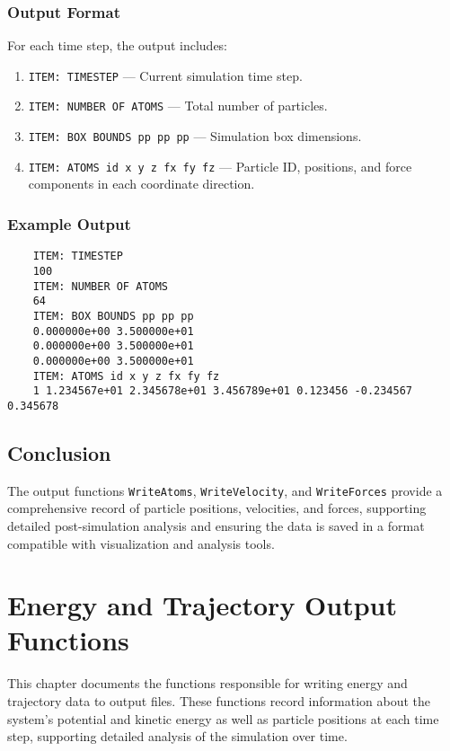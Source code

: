 \documentclass[12pt, ngerman]{report}
\begin{document}
\subsection*{Output Format}
For each time step, the output includes:
\begin{enumerate}
	\item \texttt{ITEM: TIMESTEP} --- Current simulation time step.
	\item \texttt{ITEM: NUMBER OF ATOMS} --- Total number of particles.
	\item \texttt{ITEM: BOX BOUNDS pp pp pp} --- Simulation box dimensions.
	\item \texttt{ITEM: ATOMS id x y z fx fy fz} --- Particle ID, positions, and force components in each coordinate direction.
\end{enumerate}

\subsection*{Example Output}
\begin{verbatim}
	ITEM: TIMESTEP 
	100 
	ITEM: NUMBER OF ATOMS 
	64 
	ITEM: BOX BOUNDS pp pp pp 
	0.000000e+00 3.500000e+01 
	0.000000e+00 3.500000e+01 
	0.000000e+00 3.500000e+01 
	ITEM: ATOMS id x y z fx fy fz 
	1 1.234567e+01 2.345678e+01 3.456789e+01 0.123456 -0.234567 0.345678 
\end{verbatim}

\section{Conclusion}
The output functions \texttt{WriteAtoms}, \texttt{WriteVelocity}, and \texttt{WriteForces} provide a comprehensive record of particle positions, velocities, and forces, supporting detailed post-simulation analysis and ensuring the data is saved in a format compatible with visualization and analysis tools.


\chapter{Energy and Trajectory Output Functions}
\label{chap:energy_trajectory_output}

This chapter documents the functions responsible for writing energy and trajectory data to output files. These functions record information about the system’s potential and kinetic energy as well as particle positions at each time step, supporting detailed analysis of the simulation over time.
\end{document}

